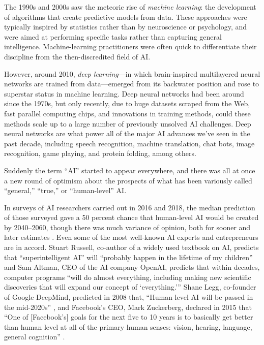 \documentclass{article}
\begin{document}
The 1990s and 2000s saw the meteoric rise of \textit{machine learning}: the development of algorithms that create predictive models from data.  These approaches were typically inspired by statistics rather than by neuroscience or psychology, and were aimed at performing specific tasks rather than capturing general intelligence.  Machine-learning practitioners were often quick to differentiate their discipline from the then-discredited field of AI.  

However, around 2010, \textit{deep learning}---in which brain-inspired multilayered neural networks are trained from data---emerged from its backwater position and rose to superstar status in machine learning. Deep neural networks had been around since the 1970s, but only recently, due to huge datasets scraped from the Web, fast parallel computing chips, and innovations in training methods, could these methods scale up to a large number of previously unsolved AI challenges.  Deep neural networks are what power all of the major AI advances we've seen in the past decade, including speech recognition, machine translation, chat bots, image recognition, game playing, and protein folding, among others.

Suddenly the term ``AI'' started to appear everywhere, and there was all at once a new round of optimism about the prospects of what has been variously called ``general,'' ``true,'' or ``human-level'' AI.   

In surveys of AI researchers carried out in 2016 and 2018, the median prediction of those surveyed gave a 50 percent chance that human-level AI would be created by 2040–2060, though there was much variance of opinion, both for sooner and later estimates \cite{Muller2016,Grace2018}. Even some of the most well-known AI experts and entrepreneurs are in accord.  Stuart Russell, co-author of a widely used textbook on AI, predicts that ``superintelligent AI'' will ``probably happen in the lifetime of my children'' \cite{Russell2019} and Sam Altman, CEO of the AI company OpenAI, predicts that within decades, computer programs ``will do almost everything, including making new scientific discoveries that will expand our concept of `everything.'\thinspace'' \cite{Altman2021} Shane Legg, co-founder of Google DeepMind, predicted in 2008 that, ``Human level AI will be passed in the mid-2020s'' \cite{Despres2008}, and Facebook's CEO, Mark Zuckerberg, declared in 2015 that ``One of [Facebook's] goals for the next five to 10 years is to basically get better than human level at all of the primary human senses: vision, hearing, language, general cognition'' \cite{McCracken2015}.
\end{document}
